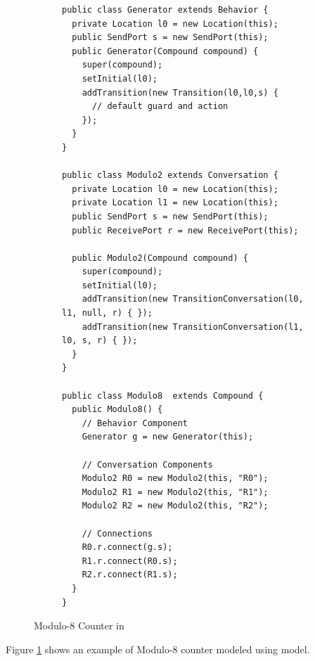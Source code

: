 \begin{figure}
\centering
\begin{subfigure}[b]{0.71\textwidth}
\centering
\begin{lstlisting}[style=customJava]
public class Generator extends Behavior {
  private Location l0 = new Location(this);
  public SendPort s = new SendPort(this);
  public Generator(Compound compound) {
    super(compound);
    setInitial(l0);
    addTransition(new Transition(l0,l0,s) {
      // default guard and action
    });
  }
}

public class Modulo2 extends Conversation {
  private Location l0 = new Location(this);
  private Location l1 = new Location(this); 
  public SendPort s = new SendPort(this);
  public ReceivePort r = new ReceivePort(this);
		
  public Modulo2(Compound compound) {
    super(compound);
    setInitial(l0);
    addTransition(new TransitionConversation(l0, l1, null, r) { });
    addTransition(new TransitionConversation(l1, l0, s, r) { });
  }
}

public class Modulo8  extends Compound {
  public Modulo8() {
    // Behavior Component
    Generator g = new Generator(this);
		
    // Conversation Components
    Modulo2 R0 = new Modulo2(this, "R0");
    Modulo2 R1 = new Modulo2(this, "R1");
    Modulo2 R2 = new Modulo2(this, "R2");
		
    // Connections
    R0.r.connect(g.s);
    R1.r.connect(R0.s);
    R2.r.connect(R1.s);
  }
}
\end{lstlisting}
\end{subfigure}%
\quad
\begin{subfigure}[b]{0.25\textwidth}
\centering
\scalebox{0.75}{}
\end{subfigure}
\caption{Modulo-8 Counter in \compmodel}\label{fig:modulo8}
\end{figure}

Figure \ref{fig:modulo8} shows an example of Modulo-8 counter modeled using {\compmodel} model. 

